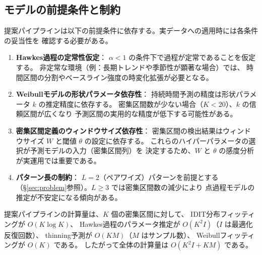\subsection{モデルの前提条件と制約}\label{subsec:constraints}

提案パイプラインは以下の前提条件に依存する。実データへの適用時には各条件の妥当性を
確認する必要がある。

\begin{enumerate}
  \item \textbf{Hawkes過程の定常性仮定}：
    $\alpha < 1$ の条件下で過程が定常であることを仮定する。
    非定常な環境（例：長期トレンドや季節性が顕著な場合）では、
    時間区間の分割やベースライン強度の時変化拡張が必要となる。
  \item \textbf{Weibullモデルの形状パラメータ依存性}：
    持続時間予測の精度は形状パラメータ $k$ の推定精度に依存する。
    密集区間数が少ない場合（$K < 20$）、$k$ の信頼区間が広くなり
    予測区間の実用的な精度が低下する可能性がある。
  \item \textbf{密集区間定義のウィンドウサイズ依存性}：
    密集区間の検出結果はウィンドウサイズ $W$ と閾値 $\theta$ の設定に依存する。
    これらのハイパーパラメータの選択が予測モデルの入力（密集区間列）を
    決定するため、$W$ と $\theta$ の感度分析が実運用では重要である。
  \item \textbf{パターン長の制約}：
    $L=2$（ペアワイズ）パターンを前提とする
    （\S\ref{sec:problem}参照）。$L \geq 3$ では密集区間数の減少により
    点過程モデルの推定が不安定になる傾向がある。
\end{enumerate}

\begin{theorem}[計算量]
  提案パイプラインの計算量は、$K$ 個の密集区間に対して、
  IDIT分布フィッティングが $O(K \log K)$、
  Hawkes過程のパラメータ推定が $O(K^2 I)$（$I$ は最適化反復回数）、
  thinning予測が $O(KM)$（$M$ はサンプル数）、
  Weibullフィッティングが $O(K)$ である。
  したがって全体の計算量は $O(K^2 I + KM)$ である。
\end{theorem}
